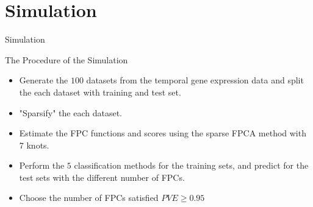 \documentclass{beamer}
\begin{document}
\section{Simulation}
\begin{frame}{Simulation}
	\begin{block}{The Procedure of the Simulation}
		\vspace{0.1cm}
		\begin{itemize}
			\item {
				Generate the $100$ datasets from the temporal gene expression data and 
				split the each dataset with training and test set.
			}
			\item {
				"Sparsify" the each dataset.
			}		
			\item {
				Estimate the FPC functions and scores using the sparse FPCA method with $7$ knots.
			}
			\item {
				Perform the $5$ classification methods for the training sets, and predict for the test sets with the different number of FPCs.
			}
			\item {
				Choose the number of FPCs satisfied $PVE \ge 0.95$
			}
		\end{itemize}
	\end{block}
\end{frame}
\end{document}
